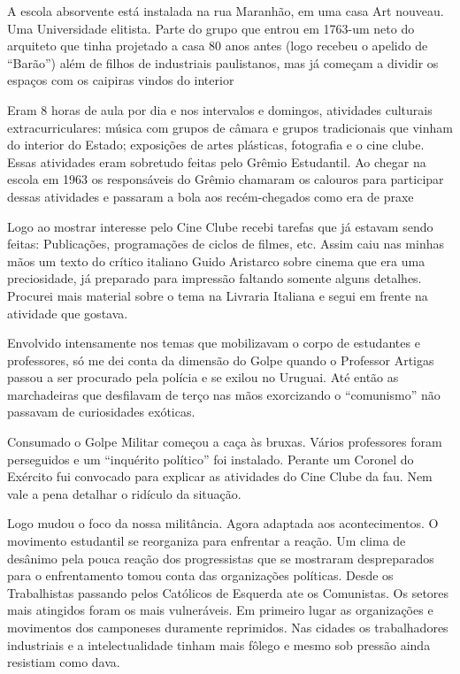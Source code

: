 A escola absorvente está instalada na rua Maranhão, em uma casa Art
nouveau. Uma Universidade elitista. Parte do grupo que entrou em 1763-um
neto do arquiteto que tinha projetado a casa 80 anos antes (logo recebeu
o apelido de “Barão”) além de filhos de industriais paulistanos, mas já
começam a dividir os espaços com os caipiras vindos do interior

Eram 8 horas de aula por dia e nos intervalos e domingos, atividades
culturais extracurriculares: música com grupos de câmara e grupos
tradicionais que vinham do interior do Estado; exposições de artes
plásticas, fotografia e o cine clube. Essas atividades eram sobretudo
feitas pelo Grêmio Estudantil. Ao chegar na escola em 1963 os
responsáveis do Grêmio chamaram os calouros para participar dessas
atividades e passaram a bola aos recém-chegados como era de praxe

Logo ao mostrar interesse pelo Cine Clube recebi tarefas que já estavam
sendo feitas: Publicações, programações de ciclos de filmes, etc. Assim
caiu nas minhas mãos um texto do crítico italiano Guido Aristarco sobre
cinema que era uma preciosidade, já preparado para impressão faltando
somente alguns detalhes. Procurei mais material sobre o tema na Livraria
Italiana e segui em frente na atividade que gostava.

Envolvido intensamente nos temas que mobilizavam o corpo de estudantes e
professores, só me dei conta da dimensão do Golpe quando o Professor
Artigas passou a ser procurado pela polícia e se exilou no Uruguai. Até
então as marchadeiras que desfilavam de terço nas mãos exorcizando o
“comunismo” não passavam de curiosidades exóticas.

\subject{O Golpe}

Consumado o Golpe Militar começou a caça às bruxas. Vários professores
foram perseguidos e um “inquérito político” foi instalado. Perante um
Coronel do Exército fui convocado para explicar as atividades do Cine
Clube da {\sc fau}. Nem vale a pena detalhar o ridículo da situação.

Logo mudou o foco da nossa militância. Agora adaptada aos
acontecimentos. O movimento estudantil se reorganiza para enfrentar a
reação. Um clima de desânimo pela pouca reação dos progressistas que se
mostraram despreparados para o enfrentamento tomou conta das
organizações políticas. Desde os Trabalhistas passando pelos Católicos
de Esquerda ate os Comunistas. Os setores mais atingidos foram os mais
vulneráveis. Em primeiro lugar as organizações e movimentos dos
camponeses duramente reprimidos. Nas cidades os trabalhadores
industriais e a intelectualidade tinham mais fôlego e mesmo sob pressão
ainda resistiam como dava.

